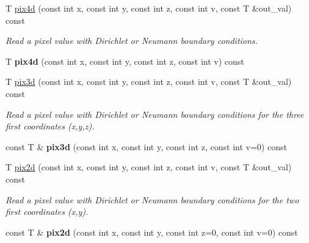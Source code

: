 \begin{DoxyCompactItemize}
\item 
T \hyperlink{structcimg__library_1_1_c_img_af366238596df572d60f361a49cbfa22c}{pix4d} (const int x, const int y, const int z, const int v, const T \&out\_\-val) const 
\begin{DoxyCompactList}\small\item\em Read a pixel value with Dirichlet or Neumann boundary conditions. \item\end{DoxyCompactList}\item 
\hypertarget{structcimg__library_1_1_c_img_a56fb8028274770f44601e8f129a813b1}{
T {\bfseries pix4d} (const int x, const int y, const int z, const int v) const }
\label{structcimg__library_1_1_c_img_a56fb8028274770f44601e8f129a813b1}

\item 
\hypertarget{structcimg__library_1_1_c_img_a947e22cc453c54c0a0b0590e64d2095f}{
T \hyperlink{structcimg__library_1_1_c_img_a947e22cc453c54c0a0b0590e64d2095f}{pix3d} (const int x, const int y, const int z, const int v, const T \&out\_\-val) const }
\label{structcimg__library_1_1_c_img_a947e22cc453c54c0a0b0590e64d2095f}

\begin{DoxyCompactList}\small\item\em Read a pixel value with Dirichlet or Neumann boundary conditions for the three first coordinates ({\ttfamily x},{\ttfamily y},{\ttfamily z}). \item\end{DoxyCompactList}\item 
\hypertarget{structcimg__library_1_1_c_img_af2848105f5f38498da8bb1a049dd4c26}{
const T \& {\bfseries pix3d} (const int x, const int y, const int z, const int v=0) const }
\label{structcimg__library_1_1_c_img_af2848105f5f38498da8bb1a049dd4c26}

\item 
\hypertarget{structcimg__library_1_1_c_img_a04fbd850fa0db4802ee50c2129d2b4bd}{
T \hyperlink{structcimg__library_1_1_c_img_a04fbd850fa0db4802ee50c2129d2b4bd}{pix2d} (const int x, const int y, const int z, const int v, const T \&out\_\-val) const }
\label{structcimg__library_1_1_c_img_a04fbd850fa0db4802ee50c2129d2b4bd}

\begin{DoxyCompactList}\small\item\em Read a pixel value with Dirichlet or Neumann boundary conditions for the two first coordinates ({\ttfamily x},{\ttfamily y}). \item\end{DoxyCompactList}\item 
\hypertarget{structcimg__library_1_1_c_img_a074bd755ee1a53bd94309b48e7b19b8f}{
const T \& {\bfseries pix2d} (const int x, const int y, const int z=0, const int v=0) const }
\label{structcimg__library_1_1_c_img_a074bd755ee1a53bd94309b48e7b19b8f}


\end{DoxyCompactItemize}
